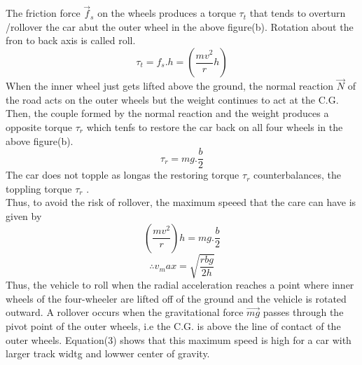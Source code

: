 \documentclass{article}
\begin{document}
\begin{enumerate}
\begin{enumerate}
		The friction force $\vec{f}_s$ on the wheels
		produces a torque $\tau_t$ that tends to overturn
		/rollover the car abut the outer wheel in the
		above figure(b). Rotation about the fron to back
		axis is called roll.
		\begin{equation}
			\tau_t = f_s.h = (\frac{mv^2}{r}h)
		\end{equation}
		When the inner wheel just gets lifted above the
		ground, the normal reaction $\vec{N}$ of the road
		acts on the outer wheels but the weight continues
		to act at the C.G. Then, the couple formed by the
		normal reaction and the weight produces a 
		opposite torque $\tau_r$ which tenfs to restore 
		the car back on all four wheels in the above
		figure(b).
		\begin{equation}
			\tau_r = mg.\frac{b}{2}
		\end{equation}	
		The car does not topple as longas the restoring
		torque $\tau_r$ counterbalances, the toppling
		torque $\tau_r$ . \\
		Thus, to avoid the risk of rollover, the maximum
		speeed that the care can have is given by
		\begin{equation}
			(\frac{mv^2}{r})h = mg.\frac{b}{2} 
		\end{equation}
		\begin{equation}
			\therefore v_max = \sqrt{\frac{rbg}{2h}}
		\end{equation}
		Thus, the vehicle to roll when the radial 
		acceleration reaches a point where inner wheels
		of the four-wheeler are lifted off of the ground
		and the vehicle is rotated outward. A rollover
		occurs when the gravitational force $\vec{mg}$
		passes through the pivot point of the outer 
		wheels, i.e the C.G. is above the line of contact
		of the outer wheels. Equation(3) shows that this
		maximum speed is high for a car with larger track
		widtg and lowwer center of gravity.
	\end{enumerate}
   \end{enumerate}
\end{document}
